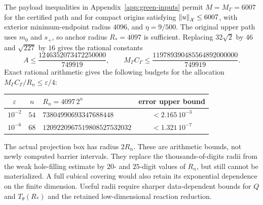 The payload inequalities in Appendix~\ref{app:green-inputs} permit
$M=M_\Gamma=6007$ for the certified path and for compact origins satisfying
$\left\lVert u\right\rVert_\mathcal X\le6007$, with exterior minimum-endpoint radius $4096$, and
$\eta=9/500$.  The original upper path uses $m_0$ and $s_+$, so anchor
radius $R_*=4097$ is sufficient.  Replacing $32\sqrt2$ by $46$ and
$\sqrt{227}$ by $16$ gives the rational constants
\begin{equation}
 A\le\frac{1246352073472250000}{749919},\qquad
 M_\Gamma C_\Gamma
 \le\frac{119789390485564892000000}{749919}.
 \label{eq:green-data-constants}
\end{equation}
Exact rational arithmetic gives the following budgets for the allocation
$M_\Gamma C_\Gamma/R_n\le\varepsilon/4$:
\begin{center}
\begin{tabular}{cclc}
\hline
$\varepsilon$ & $n$ & $R_n=4097\,2^n$ & error upper bound\\
\hline
$10^{-2}$ & $54$ & $73804990693347688448$ & $<2.165\,10^{-3}$\\
$10^{-6}$ & $68$ & $1209220967519808527532032$ & $<1.321\,10^{-7}$\\
\hline
\end{tabular}
\end{center}
The actual projection box has radius $2R_n$.
These are arithmetic bounds, not newly computed barrier intervals.
They replace the thousands-of-digits radii from the weak hole-filling
estimate by $20$- and $25$-digit values of $R_n$, but still cannot be
materialized.  A full cubical covering would also retain its exponential
dependence on the finite dimension.  Useful radii require sharper
data-dependent bounds for $Q$ and $T_\theta(R_*)$ and the retained
low-dimensional reaction reduction.

